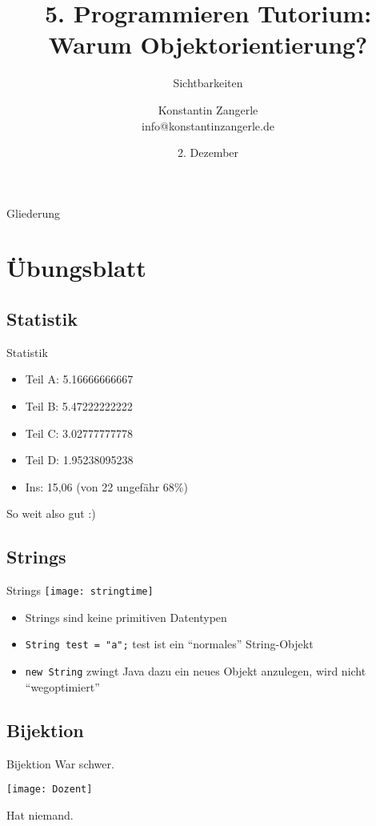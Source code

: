 \documentclass[18pt]{beamer}
\title[Programmieren Tutorium]{5. Programmieren Tutorium:\texorpdfstring{\\}{} Warum Objektorientierung?}
\subtitle{Sichtbarkeiten}
\author{Konstantin Zangerle \texorpdfstring{\\}{} info@konstantinzangerle.de}
\date{2. Dezember}
\institute{Chair for Software Design and Quality}
\begin{document}

\begin{frame}
\titlepage
\end{frame}

\begin{frame}{Gliederung}
\tableofcontents
\end{frame}
\section{Übungsblatt}
\subsection{Statistik}
\begin{frame}{Statistik}
\begin{itemize}
 \item Teil A: 5.16666666667
 \item Teil B: 5.47222222222 	
 \item Teil C: 3.02777777778 	
 \item Teil D: 1.95238095238 	
 \item Ins: 15,06 (von 22 ungefähr 68\%) 
\end{itemize}
So weit also gut :)
\end{frame}

\subsection{Strings}
\begin{frame}[fragile]{Strings}
 \texttt{[image: stringtime]}
 \begin{itemize}
  \item Strings sind keine primitiven Datentypen
  \item \verb|String test = "a";| test ist ein ``normales'' String-Objekt 
  \item \verb|new String| zwingt Java dazu ein neues Objekt anzulegen, wird nicht ``wegoptimiert''
 \end{itemize}
\end{frame}

\subsection{Bijektion}
\begin{frame}{Bijektion}
 War schwer.
 
 \texttt{[image: Dozent]} \pause
 
 Hat niemand.
\end{frame}
\end{document}

